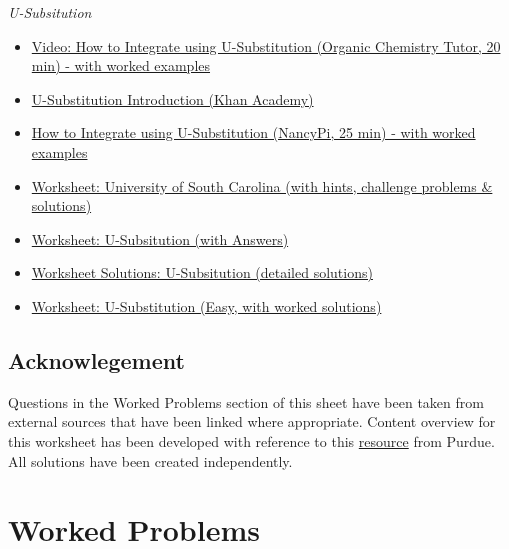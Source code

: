 \documentclass{article}
\begin{document}
\noindent\textit{U-Subsitution}
\begin{itemize}
    \item \href{https://youtu.be/sdYdnpYn-1o}{Video: How to Integrate using U-Substitution (Organic Chemistry Tutor, 20 min) - with worked examples} 

    \item \href{https://www.khanacademy.org/math/ap-calculus-ab/ab-integration-new/ab-6-9/v/u-substitution}{U-Substitution Introduction (Khan Academy)}

    \item \href{https://youtu.be/8B31SAk1nD8}{How to Integrate using U-Substitution (NancyPi, 25 min) - with worked examples}

    \item \href{https://people.math.sc.edu/josephcf/Teaching/142/Files/Worksheets/U-Substitution.pdf}{Worksheet: University of South Carolina (with hints, challenge problems \& solutions)}

    \item \href{https://cdn.kutasoftware.com/Worksheets/Calc/05%20-%20Integration%20Substitution%20Power%20Rule.pdf}{Worksheet: U-Subsitution (with Answers)}

    \item \href{https://www.rcboe.org/cms/lib/GA01903614/Centricity/Domain/1405/u%20substitution%20WS%20solutions.pdf}{Worksheet Solutions: U-Subsitution (detailed solutions)}

    \item \href{https://www.ebnet.org/cms/lib/NJ01911729/Centricity/Domain/816/U-SUBSTITUTION-INDEFINITE-ANSWERS.pdf}{Worksheet: U-Substitution (Easy, with worked solutions)}
    
\end{itemize}


\subsection*{Acknowlegement}
Questions in the Worked Problems section of this sheet have been taken from external sources that have been linked where appropriate. Content overview  for this worksheet has been developed with reference to this \href{https://www.math.purdue.edu/~dstratma/2015.Spring.Worksheets/2015.Spring.Lecture2.Worksheet.pdf}{resource} from Purdue.  All solutions have been created independently.

\pagebreak
\section*{Worked Problems}
\label{WorkedProblems}
\end{document}
